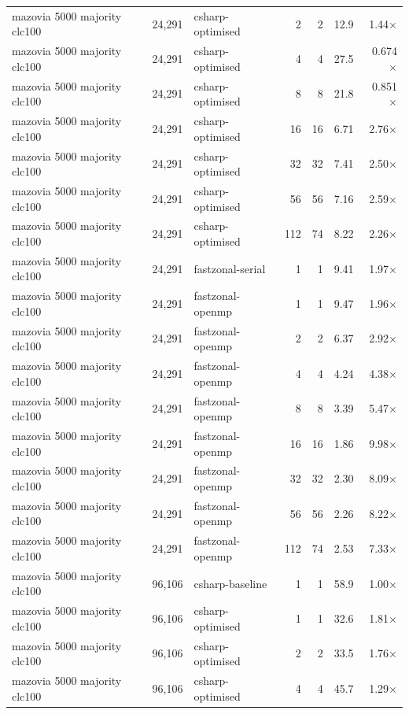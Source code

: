 \begin{tabular}{lrlrrrr}
mazovia 5000 majority clc100 & 24,291 & csharp-optimised & 2 & 2 & 12.9 & 1.44$\times$ \\
mazovia 5000 majority clc100 & 24,291 & csharp-optimised & 4 & 4 & 27.5 & 0.674$\times$ \\
mazovia 5000 majority clc100 & 24,291 & csharp-optimised & 8 & 8 & 21.8 & 0.851$\times$ \\
mazovia 5000 majority clc100 & 24,291 & csharp-optimised & 16 & 16 & 6.71 & 2.76$\times$ \\
mazovia 5000 majority clc100 & 24,291 & csharp-optimised & 32 & 32 & 7.41 & 2.50$\times$ \\
mazovia 5000 majority clc100 & 24,291 & csharp-optimised & 56 & 56 & 7.16 & 2.59$\times$ \\
mazovia 5000 majority clc100 & 24,291 & csharp-optimised & 112 & 74 & 8.22 & 2.26$\times$ \\
mazovia 5000 majority clc100 & 24,291 & fastzonal-serial & 1 & 1 & 9.41 & 1.97$\times$ \\
mazovia 5000 majority clc100 & 24,291 & fastzonal-openmp & 1 & 1 & 9.47 & 1.96$\times$ \\
mazovia 5000 majority clc100 & 24,291 & fastzonal-openmp & 2 & 2 & 6.37 & 2.92$\times$ \\
mazovia 5000 majority clc100 & 24,291 & fastzonal-openmp & 4 & 4 & 4.24 & 4.38$\times$ \\
mazovia 5000 majority clc100 & 24,291 & fastzonal-openmp & 8 & 8 & 3.39 & 5.47$\times$ \\
mazovia 5000 majority clc100 & 24,291 & fastzonal-openmp & 16 & 16 & 1.86 & 9.98$\times$ \\
mazovia 5000 majority clc100 & 24,291 & fastzonal-openmp & 32 & 32 & 2.30 & 8.09$\times$ \\
mazovia 5000 majority clc100 & 24,291 & fastzonal-openmp & 56 & 56 & 2.26 & 8.22$\times$ \\
mazovia 5000 majority clc100 & 24,291 & fastzonal-openmp & 112 & 74 & 2.53 & 7.33$\times$ \\
mazovia 5000 majority clc100 & 96,106 & csharp-baseline & 1 & 1 & 58.9 & 1.00$\times$ \\
mazovia 5000 majority clc100 & 96,106 & csharp-optimised & 1 & 1 & 32.6 & 1.81$\times$ \\
mazovia 5000 majority clc100 & 96,106 & csharp-optimised & 2 & 2 & 33.5 & 1.76$\times$ \\
mazovia 5000 majority clc100 & 96,106 & csharp-optimised & 4 & 4 & 45.7 & 1.29$\times$ \\

\end{tabular}
